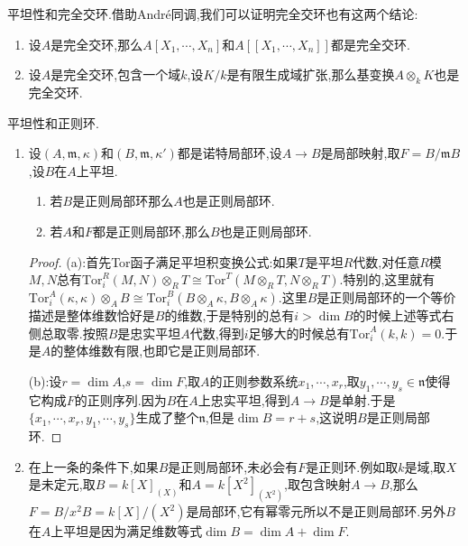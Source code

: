 平坦性和完全交环.借助Andr\'e同调,我们可以证明完全交环也有这两个结论:
\begin{enumerate}
	\item 设$A$是完全交环,那么$A[X_1,\cdots,X_n]$和$A[[X_1,\cdots,X_n]]$都是完全交环.
	\item 设$A$是完全交环,包含一个域$k$,设$K/k$是有限生成域扩张,那么基变换$A\otimes_kK$也是完全交环.
\end{enumerate}

平坦性和正则环.
\begin{enumerate}
	\item 设$(A,\mathfrak{m},\kappa)$和$(B,\mathfrak{m},\kappa')$都是诺特局部环,设$A\to B$是局部映射,取$F=B/\mathfrak{m}B$,设$B$在$A$上平坦.
	\begin{enumerate}
		\item 若$B$是正则局部环那么$A$也是正则局部环.
		\item 若$A$和$F$都是正则局部环,那么$B$也是正则局部环.
	\end{enumerate}
	\begin{proof}
		
		(a):首先Tor函子满足平坦积变换公式:如果$T$是平坦$R$代数,对任意$R$模$M,N$总有$\mathrm{Tor}_i^R(M,N)\otimes_RT\cong\mathrm{Tor}^T(M\otimes_RT,N\otimes_RT)$.特别的,这里就有$\mathrm{Tor}_i^A(\kappa,\kappa)\otimes_AB\cong\mathrm{Tor}_i^B(B\otimes_A\kappa,B\otimes_A\kappa)$.这里$B$是正则局部环的一个等价描述是整体维数恰好是$B$的维数,于是特别的总有$i>\dim B$的时候上述等式右侧总取零.按照$B$是忠实平坦$A$代数,得到$i$足够大的时候总有$\mathrm{Tor}_i^A(k,k)=0$.于是$A$的整体维数有限,也即它是正则局部环.
		
		\qquad
		
		(b):设$r=\dim A$,$s=\dim F$,取$A$的正则参数系统$x_1,\cdots,x_r$,取$y_1,\cdots,y_s\in\mathfrak{n}$使得它构成$F$的正则序列.因为$B$在$A$上忠实平坦,得到$A\to B$是单射.于是$\{x_1,\cdots,x_r,y_1,\cdots,y_s\}$生成了整个$\mathfrak{n}$,但是$\dim B=r+s$,这说明$B$是正则局部环.
	\end{proof}
    \item 在上一条的条件下,如果$B$是正则局部环,未必会有$F$是正则环.例如取$k$是域,取$X$是未定元,取$B=k[X]_{(X)}$和$A=k[X^2]_{(X^2)}$,取包含映射$A\to B$,那么$F=B/x^2B=k[X]/(X^2)$是局部环,它有幂零元所以不是正则局部环.另外$B$在$A$上平坦是因为满足维数等式$\dim B=\dim A+\dim F$.
\end{enumerate}

